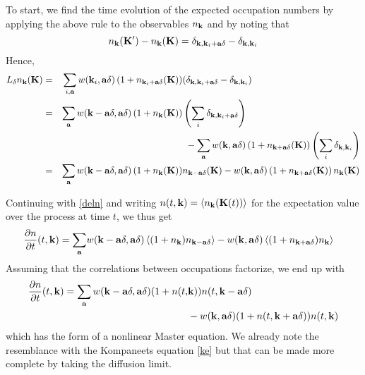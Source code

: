 \documentclass[a4paper,12pt,reqno,superscriptaddress,nofootinbib]{revtex4}
\theoremstyle{plain}
\theoremstyle{definition}
\theoremstyle{remark}
\newcommand{\0}{^{(0)}}
\newcommand{\1}{^{(1)}}
\newcommand{\2}{^{(2)}}
\begin{document}
To start, we find the time evolution of the expected occupation numbers by applying the above rule to the observables
$n_{\vb{k}}$ and by noting that  \[ n_{\vb{k}}(\vb{K}') - n_{\vb{k}}(\vb{K}) = \delta_{\vb{k},\vb{k}_i + \vb{a} 
	\delta} - \delta_{\vb{k},\vb{k}_i} \]
Hence,
\begin{alignat}{3}
L_\delta n_{\vb{k}} (\vb{K}) &=& \sum_{i,\vb{a}} w(\vb{k}_i,\vb{a}\delta) \left(1 + 
n_{\vb{k}_i+ \vb{a}\delta}(\vb{K}) \right)& (\delta_{\vb{k},\vb{k}_i + \vb{a} 
	\delta} - \delta_{\vb{k},\vb{k}_i} )\nonumber\\
&=& \sum_{\vb{a}} w( \vb{k} - \vb{a}\delta, \vb{a}\delta)
\left(1 + n_{\vb{k}}(\vb{K}) \right) &\left(\sum_i \delta_{\vb{k},\vb{k}_i + 
	\vb{a} \delta}\right) \nonumber\\
&& & \  -  \sum_{\vb{a}} w(\vb{k}, \vb{a} \delta) \left(1 + n_{\vb{k}+ \vb{a}\delta}(\vb{K}) 
\right) \left(\sum_i \delta_{\vb{k},\vb{k}_i} \right)\nonumber\\
&=& \sum_{\vb{a}}  w( \vb{k} - \vb{a}\delta, \vb{a}\delta)
\left(1 + n_{\vb{k}}(\vb{K}) \right)& n_{\vb{k} - \vb{a} \delta}(\vb{K}) - w(\vb{k}, \vb{a} \delta) \left(1 + n_{\vb{k}+ \vb{a}\delta}(\vb{K}) 
\right) n_{\vb{k}}(\vb{K})\label{deln}
\end{alignat}

Continuing with \eqref{deln} and writing $n(t,\vb{k}) = \left\langle n_{\vb{k}}(\vb{K}(t)) \right\rangle$ for the expectation value over the process at time $t$, we thus get
\begin{align*}
{\pdv{n}{t}} (t,\vb{k}) = \sum_{\vb{a}}&  w(\vb{k} - \vb{a} \delta, \vb{a}\delta) 
\left\langle (1 + n_{\vb{k}} ) n_{\vb{k} - \vb{a}\delta} \right\rangle 
-  w(\vb{k}, \vb{a}\delta) \left\langle (1 + n_{\vb{k}+\vb{a} \delta} ) 
n_{\vb{k}} \right\rangle
\end{align*}
Assuming that the correlations between occupations factorize, we end up with
\begin{align}
{\pdv{n}{t} }(t,\vb{k}) 
= \sum_{\vb{a}}  w(\vb{k} - \vb{a} \delta, \vb{a}\delta) (1 
+ n(t,&\vb{k})) n(t,\vb{k} - \vb{a}\delta) \nonumber \\
&-  w(\vb{k}, \vb{a}\delta) (1 + n(t,\vb{k}+\vb{a} \delta)) n(t,\vb{k})
\end{align}
which has the form of a nonlinear Master equation.  We already note the resemblance with the Kompaneets equation \eqref{ke} but that can be made more complete by taking the diffusion limit.
\end{document}
